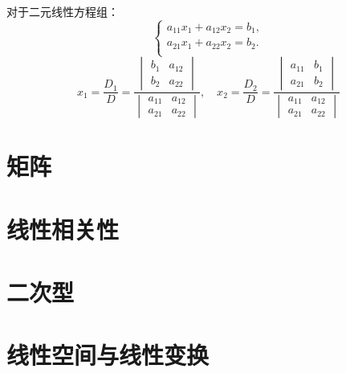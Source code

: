 \documentclass[11pt]{ctexart}
\begin{document}
对于二元线性方程组：
\[
\begin{cases}
    a_{11}x_1 + a_{12}x_2 = b_1,\\
    a_{21}x_1 + a_{22}x_2 = b_2.\\
\end{cases}
\]
\[
x_1 = \frac{D_1}{D} =
    \frac{
        \begin{vmatrix}
            b_{1} & a_{12} \\
            b_{2} & a_{22}
        \end{vmatrix}
    }{
        \begin{vmatrix}
            a_{11} & a_{12} \\
            a_{21} & a_{22}
        \end{vmatrix}
    }
,\quad
x_2 = \frac{D_2}{D} =
    \frac{
        \begin{vmatrix}
            a_{11} & b_{1} \\
            a_{21} & b_{2}
        \end{vmatrix}
    }{
        \begin{vmatrix}
            a_{11} & a_{12} \\
            a_{21} & a_{22}
        \end{vmatrix}
    }
\]

\section{矩阵}
\section{线性相关性}
\section{二次型}
\section{线性空间与线性变换}
\end{document}
